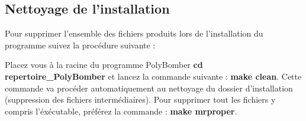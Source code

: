 \subsection{Nettoyage de l'installation}
	Pour supprimer l'ensemble des fichiers produits lors de l'installation du programme suivez la procédure suivante :
	
	Placez vous à la racine du programme PolyBomber \textbf{cd repertoire\_PolyBomber} et lancez la commande suivante : \textbf{make clean}.
Cette commande va procéder automatiquement au nettoyage du dossier d'installation (suppression des fichiers intermédiaires). Pour supprimer tout les fichiers y compris l'éxécutable, préférez la commande : \textbf{make mrproper}.
